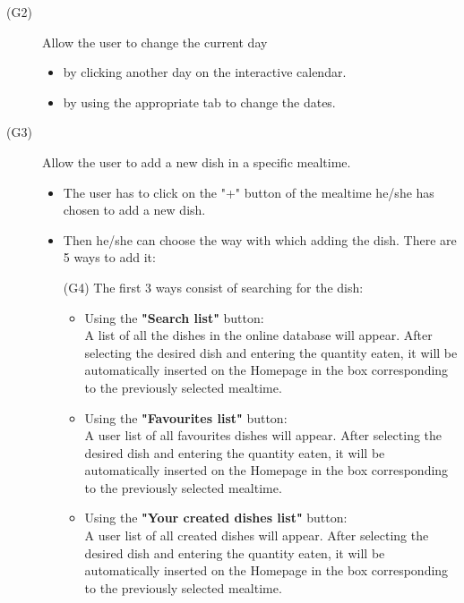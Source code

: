 \documentclass [12pt]{article}
\begin{document}
\begin{description}
\item[(G2)]Allow the user to change the current day
\begin{itemize}
\item  by clicking another day on the interactive calendar.
\item by using the appropriate tab to change the dates.
\end{itemize}
\end{description}

\begin{description}
\item[(G3)]Allow the user to add a new dish in a specific mealtime.
\begin{itemize}
\item The user has to click on the "+" button of the mealtime he/she has chosen to add a new dish.
\item  Then he/she can choose the way with which adding the dish. There are 5 ways to add it:\\
\item[(G4)] The first 3 ways consist of searching for the dish:
\begin{itemize}[•]
\item Using the \textbf{"Search list"} button:\\
A list of all the dishes in the online database will appear. After selecting the desired dish and entering the quantity eaten, it will be automatically inserted on the Homepage in the box corresponding to the previously selected mealtime.
\item Using the \textbf{"Favourites list"} button:\\
A user list of all favourites dishes will appear. After selecting the desired dish and entering the quantity eaten, it will be automatically inserted on the Homepage in the box corresponding to the previously selected mealtime. 
\item Using the \textbf{"Your created dishes list"} button:\\
A user list of all created dishes will appear. After selecting the desired dish and entering the quantity eaten, it will be automatically inserted on the Homepage in the box corresponding to the previously selected mealtime.
\end{itemize}


\end{itemize}
\end{description}
\end{document}
